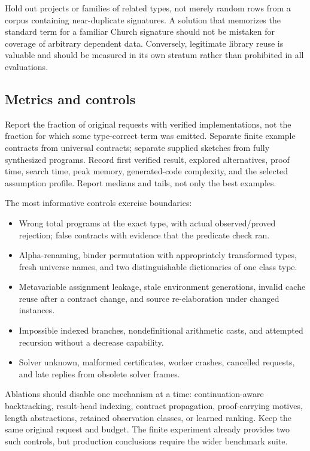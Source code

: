 Hold out projects or families of related types, not merely random rows from a
corpus containing near-duplicate signatures. A solution that memorizes the
standard term for a familiar Church signature should not be mistaken for
coverage of arbitrary dependent data. Conversely, legitimate library reuse is
valuable and should be measured in its own stratum rather than prohibited in
all evaluations.

\subsection{Metrics and controls}

Report the fraction of original requests with verified implementations, not
the fraction for which some type-correct term was emitted. Separate finite
example contracts from universal contracts; separate supplied sketches from
fully synthesized programs. Record first verified result, explored alternatives,
proof time, search time, peak memory, generated-code complexity, and the selected
assumption profile. Report medians and tails, not only the best examples.

The most informative controls exercise boundaries:
\begin{itemize}
\item Wrong total programs at the exact type, with actual observed/proved
rejection; false contracts with evidence that the predicate check ran.
\item Alpha-renaming, binder permutation with appropriately transformed types,
fresh universe names, and two distinguishable dictionaries of one class type.
\item Metavariable assignment leakage, stale environment generations, invalid
cache reuse after a contract change, and source re-elaboration under changed
instances.
\item Impossible indexed branches, nondefinitional arithmetic casts, and
attempted recursion without a decrease capability.
\item Solver unknown, malformed certificates, worker crashes, cancelled
requests, and late replies from obsolete solver frames.
\end{itemize}

Ablations should disable one mechanism at a time: continuation-aware
backtracking, result-head indexing, contract propagation, proof-carrying
motives, length abstractions, retained observation classes, or learned ranking.
Keep the same original request and budget. The finite experiment already
provides two such controls, but production conclusions require the wider
benchmark suite.

